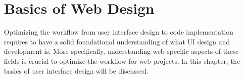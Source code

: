\newpage
\section{Basics of Web Design}
Optimizing the workflow from user interface design to code implementation requires to have a solid
foundational understanding of what UI design and development is. More specifically, understanding
web-specific aspects of these fields is crucial to optimize the workflow for web projects. In this
chapter, the basics of user interface design will be discussed.





